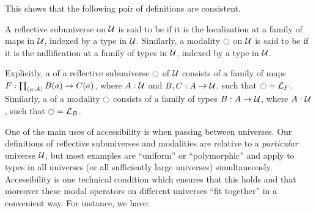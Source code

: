 This shows that the following pair of definitions are consistent.

\begin{defn}\label{defn:accessible}
A reflective subuniverse on $\mathcal{U}$ is said to be  if it is the localization at a family of maps in $\mathcal{U}$, indexed by a type in $\mathcal{U}$.
Similarly, a modality ${\ocircle}$ on $\mathcal{U}$ is said to be  if it is the nullification at a family of types in $\mathcal{U}$, indexed by a type in $\mathcal{U}$.

Explicitly, a  of a reflective subuniverse ${\ocircle}$ of $\mathcal{U}$ consists of a family of maps $F : \prd{a:A} B(a) \to C(a)$, where $A:\mathcal{U}$ and $B,C:A\to\mathcal{U}$, such that ${\ocircle} = \mathcal{L}_{F}$.
Similarly, a  of a modality ${\ocircle}$ consists of a family of types $B: A\to\mathcal{U}$, where $A:\mathcal{U}$, such that ${\ocircle} = \mathcal{L}_{B}$.
\end{defn}

One of the main uses of accessibility is when passing between universes.
Our definitions of reflective subuniverses and modalities are relative to a \emph{particular} universe $\mathcal{U}$, but most examples are ``uniform'' or ``polymorphic'' and apply to types in all universes (or all sufficiently large universes) simultaneously.
Accessibility is one technical condition which ensures that this holds and that moreover these modal operators on different universes ``fit together'' in a convenient way.
For instance, we have:

